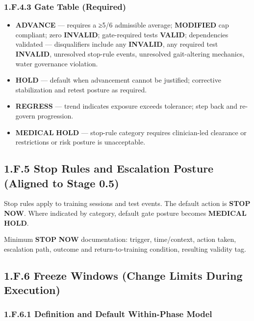 \documentclass[10pt]{article}
\begin{document}
\subsubsection*{1.F.4.3 Gate Table (Required)}

\begin{itemize}
\item \textbf{ADVANCE} — requires a ≥5/6 admissible average; \textbf{MODIFIED} cap compliant; zero \textbf{INVALID}; gate-required tests \textbf{VALID}; dependencies validated — disqualifiers include any \textbf{INVALID}, any required test \textbf{INVALID}, unresolved stop-rule events, unresolved gait-altering mechanics, water governance violation.
\item \textbf{HOLD} — default when advancement cannot be justified; corrective stabilization and retest posture as required.
\item \textbf{REGRESS} — trend indicates exposure exceeds tolerance; step back and re-govern progression.
\item \textbf{MEDICAL} \textbf{HOLD} — stop-rule category requires clinician-led clearance or restrictions or risk posture is unacceptable.
\end{itemize}

\subsection*{1.F.5 Stop Rules and Escalation Posture (Aligned to Stage 0.5)}
{}

Stop rules apply to training sessions and test events. The default action is \textbf{STOP} \textbf{NOW}. Where indicated by category, default gate posture becomes \textbf{MEDICAL} \textbf{HOLD}.

Minimum \textbf{STOP} \textbf{NOW} documentation: trigger, time/context, action taken, escalation path, outcome and return-to-training condition, resulting validity tag.

\subsection*{1.F.6 Freeze Windows (Change Limits During Execution)}
{}

\subsubsection*{1.F.6.1 Definition and Default Within-Phase Model}
\end{document}
